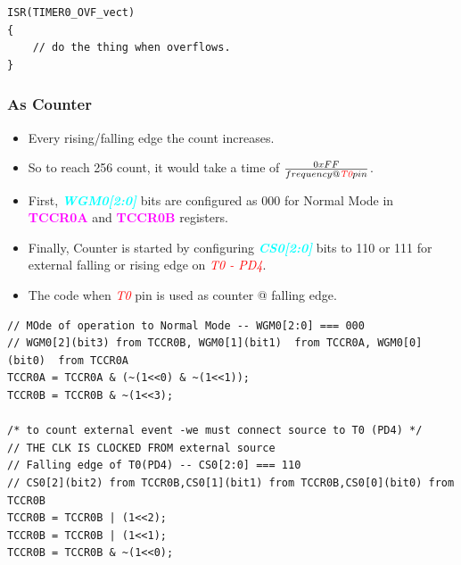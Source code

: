 \documentclass{article}
\newcommand{\bitFormat}[1]{\emph{\textbf{\textcolor{cyan}{#1}}}}
\newcommand{\regFormat}[1]{\textbf{\textcolor{magenta}{#1}}}
\newcommand{\pinFormat}[1]{\emph{\textcolor{red}{#1}}}
\begin{document}
\begin{verbatim}
ISR(TIMER0_OVF_vect)
{
    // do the thing when overflows.
}
\end{verbatim}


\subsubsection{As Counter}
\begin{itemize}
    \item Every rising/falling edge the count increases.
    \item So to reach 256 count, it would take a time of $\frac{0xFF}{frequency @ \pinFormat{T0} pin}$.
    \item First, \bitFormat{WGM0[2:0]} bits are configured as 000 for Normal Mode in \regFormat{TCCR0A} and \regFormat{TCCR0B} registers.
    \item Finally, Counter is started by configuring \bitFormat{CS0[2:0]} bits to 110 or 111 for external falling or rising edge on \pinFormat{T0 - PD4}.
    \item The code when \pinFormat{T0} pin is used as counter @ falling edge.
\end{itemize}

\begin{verbatim}
// MOde of operation to Normal Mode -- WGM0[2:0] === 000
// WGM0[2](bit3) from TCCR0B, WGM0[1](bit1)  from TCCR0A, WGM0[0](bit0)  from TCCR0A
TCCR0A = TCCR0A & (~(1<<0) & ~(1<<1));
TCCR0B = TCCR0B & ~(1<<3);
    
/* to count external event -we must connect source to T0 (PD4) */
// THE CLK IS CLOCKED FROM external source
// Falling edge of T0(PD4) -- CS0[2:0] === 110
// CS0[2](bit2) from TCCR0B,CS0[1](bit1) from TCCR0B,CS0[0](bit0) from TCCR0B
TCCR0B = TCCR0B | (1<<2);
TCCR0B = TCCR0B | (1<<1);
TCCR0B = TCCR0B & ~(1<<0);	
\end{verbatim}
\end{document}
